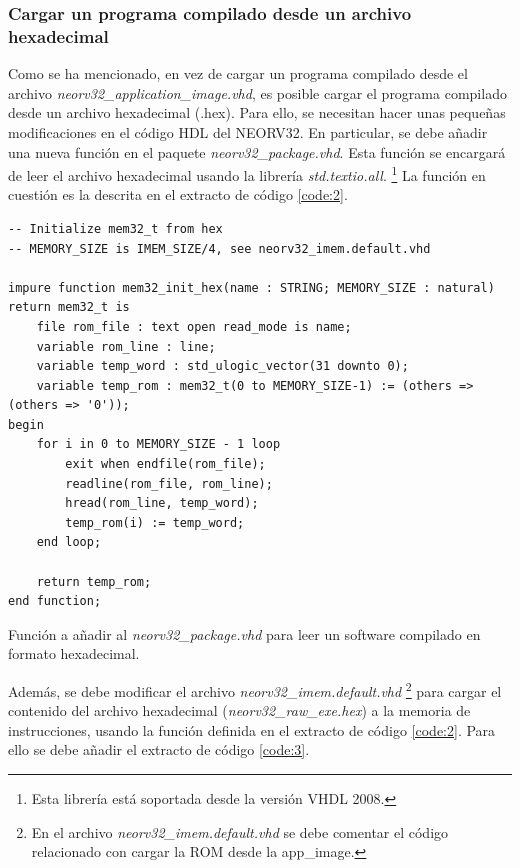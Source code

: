 \subsubsection{Cargar un programa compilado desde un archivo hexadecimal}

Como se ha mencionado, en vez de cargar un programa compilado desde el archivo \textit{neorv32\_application\_image.vhd}, es posible cargar el programa compilado desde un archivo hexadecimal (.hex).
Para ello, se necesitan hacer unas pequeñas modificaciones en el código HDL del NEORV32.
En particular, se debe añadir una nueva función en el paquete \textit{neorv32\_package.vhd}.
Esta función se encargará de leer el archivo hexadecimal usando la librería \textit{std.textio.all}. \footnote{Esta librería está soportada desde la versión VHDL 2008.}
La función en cuestión es la descrita en el extracto de código \ref{code:2}.

\vspace{3cm}

\begin{code}
\begin{verbatim}
-- Initialize mem32_t from hex
-- MEMORY_SIZE is IMEM_SIZE/4, see neorv32_imem.default.vhd

impure function mem32_init_hex(name : STRING; MEMORY_SIZE : natural) return mem32_t is
    file rom_file : text open read_mode is name;
    variable rom_line : line;
    variable temp_word : std_ulogic_vector(31 downto 0);
    variable temp_rom : mem32_t(0 to MEMORY_SIZE-1) := (others => (others => '0'));
begin
    for i in 0 to MEMORY_SIZE - 1 loop
        exit when endfile(rom_file);
        readline(rom_file, rom_line);
        hread(rom_line, temp_word);
        temp_rom(i) := temp_word;
    end loop;

    return temp_rom;
end function;
\end{verbatim}
\caption{Función a añadir al \textit{neorv32\_package.vhd} para leer un software compilado en formato hexadecimal.}
\label{code:2}
\end{code}

Además, se debe modificar el archivo \textit{neorv32\_imem.default.vhd} \footnote{En el archivo \textit{neorv32\_imem.default.vhd} se debe comentar el código relacionado con cargar la ROM desde la app\_image.} para cargar el contenido del archivo hexadecimal (\textit{neorv32\_raw\_exe.hex}) a la memoria de instrucciones, usando la función definida en el extracto de código \ref{code:2}.
Para ello se debe añadir el extracto de código \ref{code:3}.

